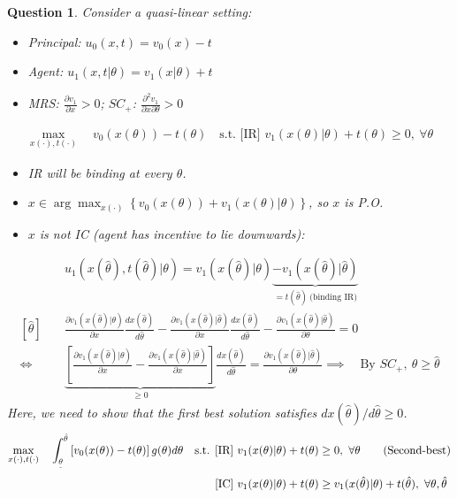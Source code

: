\documentclass[11pt,leqno]{article}
\newtheorem{HW}{Question}
\begin{document}
\begin{HW}
    Consider a quasi-linear setting:
\begin{itemize}
\item Principal: $u_{0}(x,t)=v_{0}(x)-t$
\item Agent: $u_{1}(x,t|\theta)=v_{1}(x|\theta)+t$
\item MRS: $\frac{\partial v_{1}}{\partial x}>0$; $SC_{+}$: $\frac{\partial^{2} v_{1}}{\partial x \partial \theta}>0$
\end{itemize}


\begin{align}
    \max_{x(\cdot),t(\cdot)} \quad v_{0}(x(\theta))-t(\theta)\quad \text{s.t. [IR] } v_{1}(x(\theta)|\theta)+t(\theta)\geq 0,~ \forall \theta \tag{First-best}
\end{align}
\begin{itemize}
    \item IR will be binding at every $\theta$.
    \item $x\in \arg \max_{x(\cdot)} \left\{ v_{0}(x(\theta))+ v_{1}(x(\theta)|\theta)\right\}$, so $x$ is P.O.
    \item $x$ is not IC (agent has incentive to lie downwards):
\end{itemize}

\begin{align*}
    &u_{1}(x(\hat{\theta}),t(\hat{\theta})|\theta)=v_{1}(x(\hat{\theta})|\theta)\underbrace{-v_{1}(x(\hat{\theta})|\hat{\theta})}_{=t(\hat{\theta}) ~\text{(binding IR)}}\\
    [\hat{\theta}] \quad &\frac{\partial v_{1}(x(\hat{\theta})|\theta)}{\partial x}\frac{d x(\hat{\theta})}{d \hat{\theta}}-\frac{\partial v_{1}(x(\hat{\theta})|\hat{\theta})}{\partial x}\frac{d x(\hat{\theta})}{d \hat{\theta}}-\frac{\partial v_{1}(x(\hat{\theta})|\hat{\theta})}{\partial \theta}=0\\
    \iff \quad &\underbrace{\left[\frac{\partial v_{1}(x(\hat{\theta})|\theta)}{\partial x}-\frac{\partial v_{1}(x(\hat{\theta})|\hat{\theta})}{\partial x}\right]}_{\geq 0}\frac{d x(\hat{\theta})}{d \hat{\theta}}=\frac{\partial v_{1}(x(\hat{\theta})|\hat{\theta})}{\partial \theta}
    \implies \quad \text{By } SC_{+}, ~\theta \geq \hat{\theta}
\end{align*}
Here, we need to show that the first best solution satisfies $d x(\hat{\theta})/d \hat{\theta}\geq 0$.
\begin{align}
    \max_{x(\cdot),t(\cdot)} \quad \int_{\underset{\bar{}}{\theta}}^{\hat{\theta}} \left[v_{0}(x(\theta))-t(\theta)\right] g(\theta) d\theta \quad \text{s.t. [IR] } &v_{1}(x(\theta)|\theta)+t(\theta)\geq 0,~ \forall \theta \tag{Second-best} \\ \text{[IC] }&v_{1}(x(\theta)|\theta)+t(\theta)\geq v_{1}(x(\hat{\theta})|\theta)+t(\hat{\theta}),~ \forall \theta, \hat{\theta} \notag
\end{align}


\end{HW}
\end{document}
